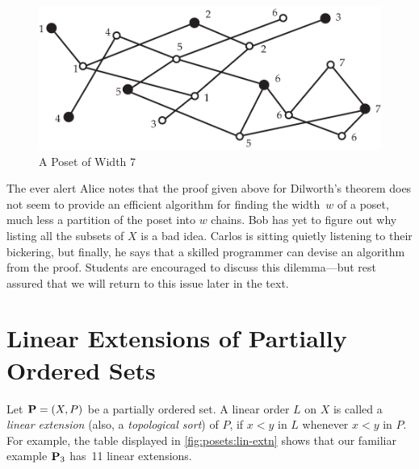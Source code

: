 \begin{figure}
\begin{center}
\includegraphics*[scale=.4]{posets-figs/width7.pdf}
\caption{A Poset of Width 7}
\label{fig:width7}
\end{center}
\end{figure}

\begin{remark}
The ever alert Alice notes that
the proof given above for Dilworth's theorem does not seem to provide
an efficient algorithm for finding the width~$w$ of a poset, much less
a partition of the poset into $w$ chains.  Bob has yet to figure out
why listing all the subsets of $X$ is a bad idea.  Carlos is sitting
quietly listening to their bickering, but finally, he says that a skilled
programmer can devise an algorithm from the proof.  Students are encouraged
to discuss this dilemma---but rest assured that we will return to 
this issue later in the text.
\end{remark}

\section{Linear Extensions of Partially Ordered Sets}\label{s:posets:sorting}

Let $\mathbf{P}=(X,P)$ be a partially ordered set.  A linear order $L$ on $X$ is
called a \textit{linear extension} (also, a \textit{topological sort})
of $P$, if $x<y$ in $L$ whenever $x<y$ in $P$.  For example, the
table displayed in \autoref{fig:posets:lin-extn} shows that our familiar
example $\mathbf{P}_3$ has~11 linear extensions.

